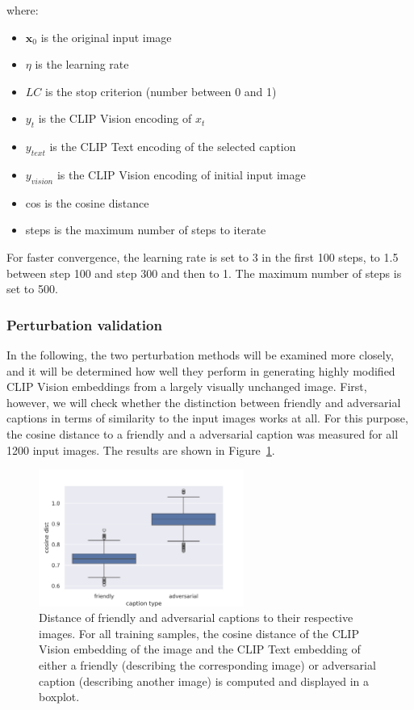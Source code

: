 where:
\begin{itemize}
    \item $\mathbf{x}_0$ is the original input image
    \item $\eta$ is the learning rate
    \item $LC$ is the stop criterion (number between 0 and 1)
    \item $y_t$ is the CLIP Vision encoding of $x_t$
    \item $y_{text}$ is the CLIP Text encoding of the selected caption
    \item $y_{vision}$ is the CLIP Vision encoding of initial input image
    \item cos is the cosine distance
    \item steps is the maximum number of steps to iterate
\end{itemize}

For faster convergence, the learning rate is set to 3 in the first 100 steps, to 1.5 between step 100 and step 300 and then to 1. The maximum number of steps is set to 500.

\subsubsection{Perturbation validation}

In the following, the two perturbation methods will be examined more closely, and it will be determined how well they perform in generating highly modified CLIP Vision embeddings from a largely visually unchanged image. First, however, we will check whether the distinction between friendly and adversarial captions in terms of similarity to the input images works at all. For this purpose, the cosine distance to a friendly and a adversarial caption was measured for all 1200 input images. The results are shown in Figure~\ref{fig:advpert_sanity_check_friendly_vs_adversarial_cap}.

\begin{figure}[ht]
    \centering
    \includegraphics[width=0.6\textwidth]{plots/advpert_sanity_check_friendly_vs_adversarial_cap.png}
    \caption[Similarity of caption embeddings to the respective images]{Distance of friendly and adversarial captions to their respective images. For all training samples, the cosine distance of the CLIP Vision embedding of the image and the CLIP Text embedding of either a friendly (describing the corresponding image) or adversarial caption (describing another image) is computed and displayed in a boxplot.}\label{fig:advpert_sanity_check_friendly_vs_adversarial_cap}
\end{figure}

